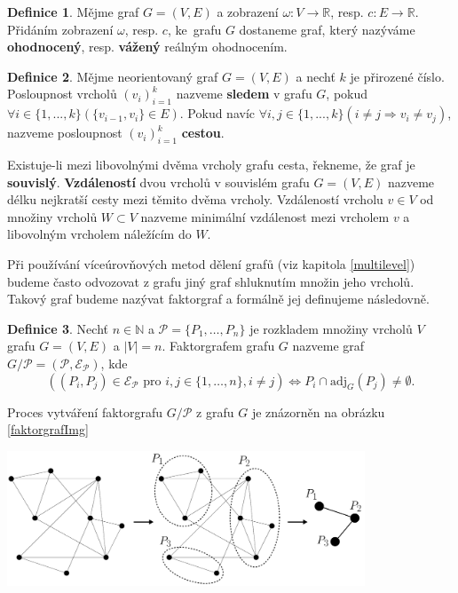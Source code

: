 \documentclass[11pt,american,czech,oneside]{book}
\theoremstyle{plain}
\theoremstyle{definition}
\newtheorem{definition}{Definice}
\begin{document}
\begin{definition}
  Mějme graf $G=(V,E)$ a zobrazení $\omega:V \rightarrow \mathbb{R}$, resp. $c: E \rightarrow \mathbb{R}$. Přidáním zobrazení $\omega$, resp. $c$, ke~grafu $G$ dostaneme graf, který nazýváme \textbf{ohodnocený}, resp. \textbf{vážený} reálným ohodnocením.
\end{definition}

\begin{definition}
  Mějme neorientovaný graf $G=(V,E)$ a nechť $k$ je přirozené číslo. Posloupnost vrcholů $(v_i)_{i=1}^{k}$ nazveme \textbf{sledem} v grafu $G$, pokud $\forall i \in \{1,...,k\} (\{v_{i-1},v_i\} \in E)$. Pokud navíc  $\forall i,j \in \{1,...,k\} (i \neq j \Rightarrow v_i \neq v_j)$, nazveme posloupnost $(v_i)_{i=1}^{k}$ \textbf{cestou}.
\end{definition}

Existuje-li mezi libovolnými dvěma vrcholy grafu cesta, řekneme, že graf je \textbf{souvislý}.
\textbf{Vzdáleností} dvou vrcholů v souvislém grafu $G=(V,E)$ nazveme délku nejkratší cesty mezi těmito dvěma vrcholy. Vzdáleností vrcholu $v \in V$ od množiny vrcholů $W \subset V$ nazveme minimální vzdálenost mezi vrcholem $v$ a libovolným vrcholem náležícím do $W$. 

\medskip

Při používání víceúrovňových metod dělení grafů (viz kapitola \ref{multilevel}) budeme často odvozovat z grafu jiný graf shluknutím množin jeho vrcholů. Takový graf budeme nazývat faktorgraf a formálně jej definujeme následovně.

\begin{definition}
  Nechť $n\in \mathbb{N}$ a $\mathcal{P} = \{P_1,\ldots,P_n\}$ je rozkladem množiny vrcholů $V$ grafu $G = (V, E)$ a $|V|=n$. Faktorgrafem grafu $G$ nazveme graf $G / \mathcal{P} = (\mathcal{P}, \mathcal{E_P})$, kde 
  \[
    \left(
      (P_i, P_j)\in \mathcal{E_P} \mbox{ pro } i,j \in \{1,\ldots,n\}, i \neq j 
    \right)
    \Leftrightarrow {P_i \cap \mathrm{adj}_G(P_j) \neq \emptyset}
    .
  \]
\end{definition}

Proces vytváření faktorgrafu $G / \mathcal{P}$ z grafu $G$ je znázorněn na obrázku \ref{faktorgrafImg}

\bigskip
{
  \centering
  \includegraphics[width=0.8\textwidth]{pictures/faktorgrafcomplete.pdf}
}
\end{document}
